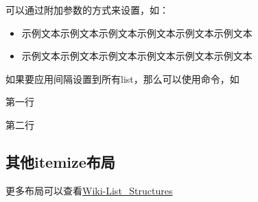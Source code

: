     可以通过附加参数的方式来设置，如：
    \begin{itemize}[itemsep=1ex, leftmargin=1cm]
        \item 示例文本示例文本示例文本示例文本示例文本示例文本
        \item 示例文本示例文本示例文本示例文本示例文本示例文本
    \end{itemize}
        
    如果要应用间隔设置到所有list，那么可以使用命令，如
    \begin{texshow}
        \begin{romanlist}
            \item 第一行
            \item 第二行
        \end{romanlist}
    \end{texshow}
        
    \subsection{其他itemize布局}
    更多布局可以查看\href{https://en.wikibooks.org/wiki/LaTeX/List_Structures}{Wiki-List\_{}Structures}